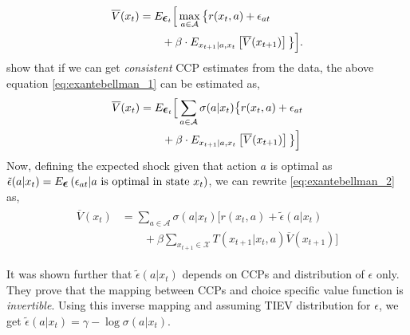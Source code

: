 \documentclass{article}
\renewcommand{\vec}[1]{\mbox{\bm{$#1$}}}
\begin{document}
\begin{align} \label{eq:exantebellman_1}
\begin{split}
\overline{V}(x_t) & = E_{\vec{\epsilon}_t}\Big[\max_{a\in\mathcal{A}} \big\{r(x_t,a)+\epsilon_{at} \\
& \qquad +\beta  \cdot E_{x_{t+1}|a,x_t} \left[ \overline{V}(x_{t+1}) \right] \big\}\Big].\\
\end{split}
\end{align}
\cite{hotz} show that if we can get \textit{consistent} CCP estimates from the data, the above equation \eqref{eq:exantebellman_1} can be estimated as,
\begin{align} \label{eq:exantebellman_2}
\begin{split}
\overline{V}(x_t) & = E_{\vec{\epsilon}_t}\Big[\sum_{a\in\mathcal{A}} \sigma(a|x_t) \big\{r(x_t,a)+\epsilon_{at} \\
& \qquad +\beta  \cdot E_{x_{t+1}|a,x_t} \left[ \overline{V}(x_{t+1}) \right] \big\}\Big]\\
\end{split}
\end{align}
Now, defining the expected shock given that action $a$ is optimal as $\tilde{\epsilon}(a|x_t) = E_{\vec{\epsilon}}\left( \epsilon_{at} |a\ \textrm{is optimal in state } x_t\right)$, we can rewrite \eqref{eq:exantebellman_2} as,
\begin{align} \label{eq:exantebellman_3}
\begin{split}
\overline{V}(x_t) & = \sum_{a\in\mathcal{A}} \sigma(a|x_t) \Big[r(x_t,a)+\tilde{\epsilon}(a|x_t) \\
& \qquad +\beta \sum_{x_{t+1}\in\mathcal{X}} T(x_{t+1}|x_t,a) \overline{V}(x_{t+1})\Big]
\end{split}
\end{align}

It was shown further that $\tilde{\epsilon}(a|x_t)$ depends on CCPs and distribution of $\epsilon$ only. They prove that the mapping between CCPs and choice specific value function is \emph{invertible}. Using this inverse mapping and assuming TIEV distribution for $\epsilon$, we get $\tilde{\epsilon}(a|x_t) = \gamma - \log \sigma(a|x_t)$.
\end{document}
